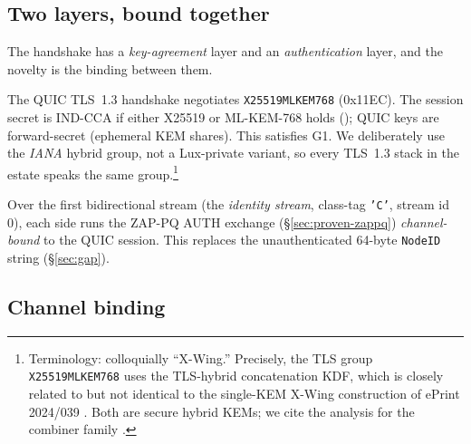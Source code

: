 \documentclass[11pt,a4paper]{article}
\newcommand{\msg}[1]{\textsf{#1}}
\newcommand{\code}[1]{\texttt{#1}}
\begin{document}
\subsection{Two layers, bound together}

The handshake has a \emph{key-agreement} layer and an
\emph{authentication} layer, and the novelty is the binding between
them.

\begin{description}[leftmargin=0pt]
  \item[Layer 1 --- Confidential channel (live).] The QUIC TLS~1.3
        handshake negotiates \code{X25519MLKEM768} (0x11EC). The session
        secret is IND-CCA if either X25519 or ML-KEM-768 holds
        (\cite{xwing,ghp2018combiners,bindel2019hybrid}); QUIC keys are
        forward-secret (ephemeral KEM shares). This satisfies G1. We
        deliberately use the \emph{IANA} hybrid group, not a Lux-private
        variant, so every TLS~1.3 stack in the estate speaks the same
        group.\footnote{Terminology: colloquially ``X-Wing.'' Precisely,
        the TLS group \code{X25519MLKEM768} uses the TLS-hybrid
        concatenation KDF, which is closely related to but not identical
        to the single-KEM X-Wing construction of ePrint 2024/039
        \cite{xwing}. Both are secure hybrid KEMs; we cite the analysis
        for the combiner family \cite{ghp2018combiners}.}
  \item[Layer 2 --- Hybrid identity (design).] Over the first
        bidirectional stream (the \emph{identity stream}, class-tag
        \code{'C'}, stream id 0), each side runs the ZAP-PQ \msg{AUTH}
        exchange (\S\ref{sec:proven-zappq}) \emph{channel-bound} to the
        QUIC session. This replaces the unauthenticated 64-byte
        \code{NodeID} string (\S\ref{sec:gap}).
\end{description}

\subsection{Channel binding}\label{sec:cb}
\end{document}
